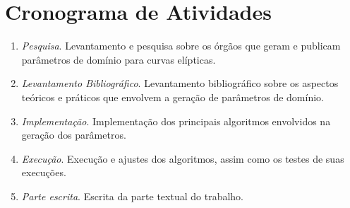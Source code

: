 %
%
\section{Cronograma de Atividades}
\begin{enumerate}
\item \textit{Pesquisa}. Levantamento e pesquisa sobre os órgãos que geram e publicam parâmetros de domínio para curvas elípticas.
\item \textit{Levantamento Bibliográfico}. Levantamento bibliográfico sobre os aspectos teóricos e práticos que envolvem a geração de parâmetros de domínio.
\item \textit{Implementação}. Implementação dos principais algoritmos envolvidos na geração dos parâmetros.
\item \textit{Execução}. Execução e ajustes dos algoritmos, assim como os testes de suas execuções.
\item \textit{Parte escrita}. Escrita da parte textual do trabalho.
\end{enumerate}


